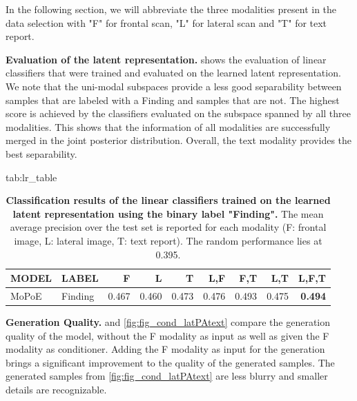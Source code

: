 \documentclass{midl} %
\begin{document}
    In the following section, we will abbreviate the three modalities present in the data selection with "F" for frontal scan, "L" for lateral scan and "T" for text report.
    
    \textbf{Evaluation of the latent representation.}  shows the evaluation of linear classifiers that were trained and evaluated on the learned latent representation.
    We note that the uni-modal subspaces provide a less good separability between samples that are labeled with a Finding and samples that are not.
    The highest score is achieved by the classifiers evaluated on the subspace spanned by all three modalities.
    This shows that the information of all modalities are successfully merged in the joint posterior distribution.  
    Overall, the text modality provides the best separability.
    
    \begin{table}[htbp]
    \floatconts
      {tab:lr_table}%
      {\caption{\textbf{Classification results of the linear classifiers trained on the learned latent representation using the binary label "Finding".} 
      The mean average precision over the test set is reported for each modality (F: frontal image, L: lateral image, T: text report).
      The random performance lies at 0.395.}}%
      {\begin{tabular}{llrrrrrrr}
                MODEL & LABEL   & F     & L     & T     & L,F   & F,T   & L,T   & L,F,T          \\
                \midrule
                MoPoE & Finding & 0.467 & 0.460 & 0.473 & 0.476 & 0.493 & 0.475 & \textbf{0.494} \\
    
            \end{tabular}}
    \end{table}
    
    
    \textbf{Generation Quality.}  and \cref{fig:fig_cond_latPAtext} compare the generation quality of the model, without the F modality as input as well as given the F modality as conditioner.
    Adding the F modality as input for the generation brings a significant improvement to the quality of the generated samples.
    The generated samples from \cref{fig:fig_cond_latPAtext} are less blurry and smaller details are recognizable.
\end{document}
